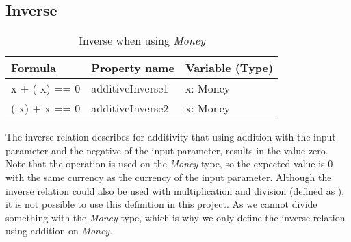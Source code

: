 \subsection*{Inverse}
\FloatBarrier
\begin{table}[!ht]
\centering
\begin{tabular}{lll}
\hline
                        \textbf{Formula} & \textbf{Property name} & \textbf{Variable (Type)} \\ \hline
\rowcolor[HTML]{EFEFEF} x + (-x) == 0    & additiveInverse1       & x: Money                 \\
                        (-x) + x == 0    & additiveInverse2       & x: Money                 \\ \hline
\end{tabular}
\caption{Inverse when using \textit{Money}}
\label{tbl:ch4_money_inverse}
\end{table}
\FloatBarrier
The inverse relation describes for additivity that using addition with the input parameter and the negative of the input parameter, results in the value zero. Note that the operation is used on the \textit{Money} type, so the expected value is 0 with the same currency as the currency of the input parameter. Although the inverse relation could also be used with multiplication and division (defined as ), it is not possible to use this definition in this project. As we cannot divide something with the \textit{Money} type, which is why we only define the inverse relation using addition on \textit{Money}.

